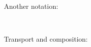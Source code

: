 {{{Another notation:

\begin{code}%
\>[0]\AgdaSpace{}%
\AgdaSymbol{=}\AgdaSpace{}%
\<%
\end{code}

\begin{code}%
\>[0]\AgdaSpace{}%
\AgdaSpace{}%
\<%
\\
\>[0]\AgdaSpace{}%
\AgdaSpace{}%
\AgdaSpace{}%
\AgdaSpace{}%
\AgdaSpace{}%
\AgdaSpace{}%
\AgdaSymbol{=}\AgdaSpace{}%
\AgdaSpace{}%
\AgdaSpace{}%
\AgdaSpace{}%
\AgdaFunction{[}\AgdaSpace{}%
\AgdaSpace{}%
\AgdaFunction{/}\AgdaSpace{}%
\AgdaSpace{}%
\AgdaFunction{]}\<%
\end{code}

Transport and composition:

}}}

